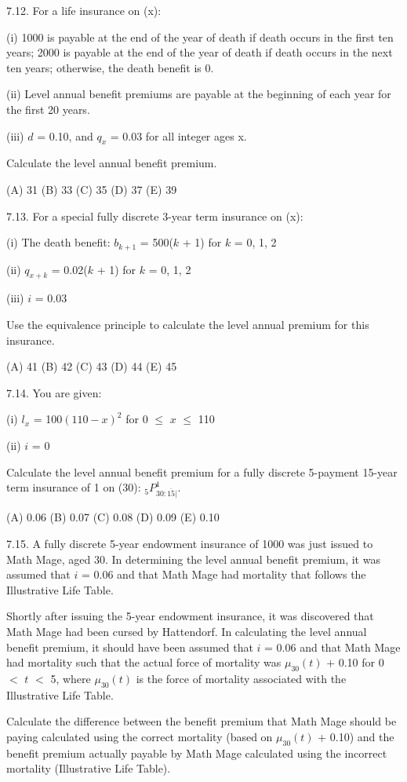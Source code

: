 \documentclass[]{book}
\begin{document}
7.12. For a life insurance on (x):

(i) 1000 is payable at the end of the year of death if death occurs in
the first ten years; 2000 is payable at the end of the year of death if
death occurs in the next ten years; otherwise, the death benefit is 0.

(ii) Level annual benefit premiums are payable at the beginning of each
year for the first 20 years.

(iii) \(d\) = 0.10, and \(q_x\) = 0.03 for all integer ages x.

Calculate the level annual benefit premium.

(A) 31 (B) 33 (C) 35 (D) 37 (E) 39

7.13. For a special fully discrete 3-year term insurance on (x):

(i) The death benefit: \(b_{k + 1}\) = 500(\(k\) + 1) for \(k\) = 0, 1,
2

(ii) \(q_{x + k}\) = 0.02(\(k\) + 1) for \(k\) = 0, 1, 2

(iii) \(i\) = 0.03

Use the equivalence principle to calculate the level annual premium for
this insurance.

(A) 41 (B) 42 (C) 43 (D) 44 (E) 45

7.14. You are given:

(i) \(l_x\) = 100\((110 - x)^2\) for 0 \(\le\) \(x\) \(\le\) 110

(ii) \(i\) = 0

Calculate the level annual benefit premium for a fully discrete
5-payment 15-year term insurance of 1 on (30):
\({}_{5} {P}_{30:\overline{15}|}^{1}\).

(A) 0.06 (B) 0.07 (C) 0.08 (D) 0.09 (E) 0.10

7.15. A fully discrete 5-year endowment insurance of 1000 was just
issued to Math Mage, aged 30. In determining the level annual benefit
premium, it was assumed that \(i\) = 0.06 and that Math Mage had
mortality that follows the Illustrative Life Table.

Shortly after issuing the 5-year endowment insurance, it was discovered
that Math Mage had been cursed by Hattendorf. In calculating the level
annual benefit premium, it should have been assumed that \(i\) = 0.06
and that Math Mage had mortality such that the actual force of mortality
was \(\mu_{30}(t)\) + 0.10 for 0 \(<\) \(t\) \(<\) 5, where
\(\mu_{30}(t)\) is the force of mortality associated with the
Illustrative Life Table.

Calculate the difference between the benefit premium that Math Mage
should be paying calculated using the correct mortality (based on
\(\mu_{30}(t)\) + 0.10) and the benefit premium actually payable by Math
Mage calculated using the incorrect mortality (Illustrative Life Table).
\end{document}
